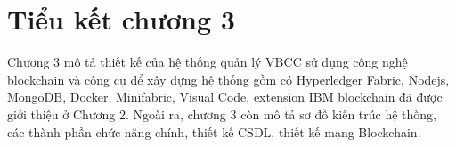\begin{enumerate}
    
\end{enumerate}

\section{Tiểu kết chương 3}

Chương 3 mô tả thiết kế của hệ thống quản lý VBCC sử dụng công nghệ blockchain và công cụ để xây dựng hệ thống gồm có Hyperledger Fabric, Nodejs, MongoDB, Docker, Minifabric, Visual Code, extension IBM blockchain đã được giới thiệu ở Chương 2. Ngoài ra, chương 3 còn mô tả sơ đồ kiến trúc hệ thống, các thành phần chức năng chính, thiết kế CSDL, thiết kế mạng Blockchain. 

